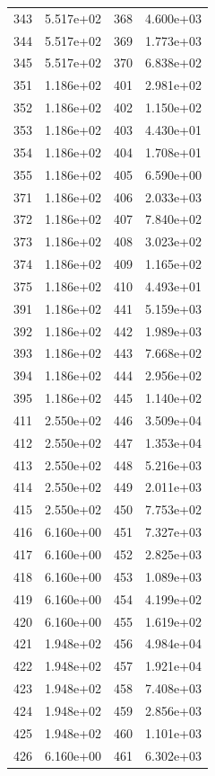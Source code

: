 \documentclass[12pt]{article}
\begin{document}
\begin{longtable}{@{}cccc@{}}
343 & 5.517e+02 & 368 & 4.600e+03 \\
344 & 5.517e+02 & 369 & 1.773e+03 \\
345 & 5.517e+02 & 370 & 6.838e+02 \\
351 & 1.186e+02 & 401 & 2.981e+02 \\
352 & 1.186e+02 & 402 & 1.150e+02 \\
353 & 1.186e+02 & 403 & 4.430e+01 \\
354 & 1.186e+02 & 404 & 1.708e+01 \\
355 & 1.186e+02 & 405 & 6.590e+00 \\
371 & 1.186e+02 & 406 & 2.033e+03 \\
372 & 1.186e+02 & 407 & 7.840e+02 \\
373 & 1.186e+02 & 408 & 3.023e+02 \\
374 & 1.186e+02 & 409 & 1.165e+02 \\
375 & 1.186e+02 & 410 & 4.493e+01 \\
391 & 1.186e+02 & 441 & 5.159e+03 \\
392 & 1.186e+02 & 442 & 1.989e+03 \\
393 & 1.186e+02 & 443 & 7.668e+02 \\
394 & 1.186e+02 & 444 & 2.956e+02 \\
395 & 1.186e+02 & 445 & 1.140e+02 \\
411 & 2.550e+02 & 446 & 3.509e+04 \\
412 & 2.550e+02 & 447 & 1.353e+04 \\
413 & 2.550e+02 & 448 & 5.216e+03 \\
414 & 2.550e+02 & 449 & 2.011e+03 \\
415 & 2.550e+02 & 450 & 7.753e+02 \\
416 & 6.160e+00 & 451 & 7.327e+03 \\
417 & 6.160e+00 & 452 & 2.825e+03 \\
418 & 6.160e+00 & 453 & 1.089e+03 \\
419 & 6.160e+00 & 454 & 4.199e+02 \\
420 & 6.160e+00 & 455 & 1.619e+02 \\
421 & 1.948e+02 & 456 & 4.984e+04 \\
422 & 1.948e+02 & 457 & 1.921e+04 \\
423 & 1.948e+02 & 458 & 7.408e+03 \\
424 & 1.948e+02 & 459 & 2.856e+03 \\
425 & 1.948e+02 & 460 & 1.101e+03 \\
426 & 6.160e+00 & 461 & 6.302e+03 \\

\end{longtable}
\end{document}
